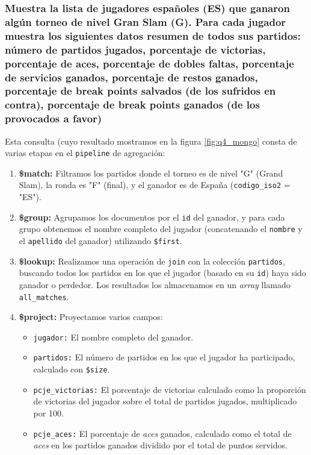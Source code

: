\subsubsection{Muestra la lista de jugadores españoles (ES) que ganaron algún torneo de nivel Gran Slam (G). Para cada jugador muestra los siguientes datos resumen de todos sus partidos: número de partidos jugados, porcentaje de victorias, porcentaje de aces, porcentaje de dobles faltas, porcentaje de servicios ganados, porcentaje de restos ganados, porcentaje de break points salvados (de los sufridos en contra), porcentaje de break points ganados (de los provocados a favor)}

Esta consulta (cuyo resultado mostramos en la figura \ref{fig:q4_mongo} consta de varias etapas en el \texttt{pipeline} de agregación:

\begin{enumerate}
    \item \textbf{\$match:} Filtramos los partidos donde el torneo es de nivel "G" (Grand Slam), la ronda es "F" (final), y el ganador es de España (\texttt{codigo\_iso2} = "ES").
    \item \textbf{\$group:} Agrupamos los documentos por el \texttt{id} del ganador, y para cada grupo obtenemos el nombre completo del jugador (concatenando el \texttt{nombre} y el \texttt{apellido} del ganador) utilizando \texttt{\$first}.
    \item \textbf{\$lookup:} Realizamos una operación de \texttt{join} con la colección \texttt{partidos}, buscando todos los partidos en los que el jugador (basado en su \texttt{id}) haya sido ganador o perdedor. Los resultados los almacenamos en un \textit{array} llamado \texttt{all\_matches}.
    \item \textbf{\$project:} Proyectamos varios campos:
    \begin{itemize}
        \item \texttt{jugador:} El nombre completo del ganador.
        \item \texttt{partidos:} El número de partidos en los que el jugador ha participado, calculado con \texttt{\$size}.
        \item \texttt{pcje\_victorias:} El porcentaje de victorias calculado como la proporción de victorias del jugador sobre el total de partidos jugados, multiplicado por 100.
        \item \texttt{pcje\_aces:} El porcentaje de \textit{aces} ganados, calculado como el total de \textit{aces} en los partidos ganados dividido por el total de puntos servidos.

\end{itemize}
\end{enumerate}
